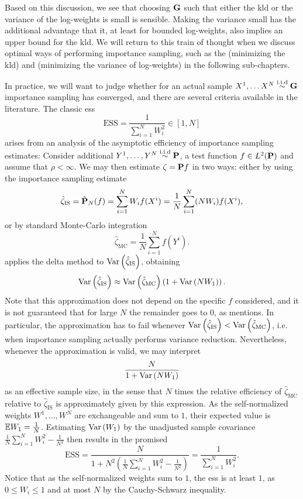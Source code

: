 Based on this discussion, we see that choosing $\G$ such that either the \acrshort{kld} or the variance of the log-weights is small is sensible. Making the variance small has the additional advantage that it, at least for bounded log-weights, also implies an upper bound for the \acrshort{kld}. We will return to this train of thought when we discuss optimal ways of performing importance sampling, such as the \acem (minimizing the \acrshort{kld}) and \aeis (minimizing the variance of log-weights) in the following sub-chapters.

In practice, we will want to judge whether for an actual sample $X^{1}, \dots X^{N} \iid \G$ importance sampling has converged, and there are several criteria available in the literature. The classic \gls{ess}\citep{Kong1994Sequential} 
$$
\text{ESS} = \frac{1}{\sum_{i = 1}^N W^{2}_{i}} \in \left[1, N\right]
$$
arises from an analysis of the asymptotic efficiency of importance sampling estimates: Consider additional $Y^{1}, \dots, Y^{N}\iid \P$, a test function $f \in L^{2} (\P)$ and assume that $\rho < \infty$. We may then estimate $\zeta = \P f$ in two ways: either by using the importance sampling estimate 
$$
\hat \zeta_{\text{IS}} = \hat \P_{N} (f) = \sum_{i = 1}^N W_{i} f(X^{i}) = \frac{1}{N} \sum_{i = 1}^N (NW_{i}) f(X^{i}),
$$
or by standard Monte-Carlo integration 
$$
\hat \zeta_{\text{MC}} = \frac{1}{N}\sum_{i = 1}^N f(Y^{i}).
$$
\citep{Kong1992Note} applies the delta method to $\var \left( \hat\zeta_{\text{IS}} \right)$, obtaining
\begin{align*}
    \var \left( \hat\zeta_{\text{IS}}  \right) \approx \var \left( \hat \zeta_{\text{MC}} \right)\left( 1 + \var \left( NW_{1}\right) \right).
\end{align*}
Note that this approximation does not depend on the specific $f$ considered, and it is not guaranteed that for large $N$ the remainder goes to $0$, as \citep{Kong1992Note} mentions. In particular, the approximation has to fail whenever $\var \left( \hat\zeta_{\text{IS}} \right) < \var \left( \hat \zeta_{\text{MC}} \right)$, i.e. when importance sampling actually performs variance reduction. Nevertheless, whenever the approximation is valid, we may interpret 
$$
\frac{N}{1 + \var \left( NW_{1} \right)}
$$
as an effective sample size, in the sense that $N$ times the relative efficiency of $\hat\zeta_{\text{MC}}$ relative to $\hat \zeta_{\text{IS}}$ is approximately given by this expression. As the self-normalized  weights $W^{1}, \dots, W^{N}$ are exchangeable and sum to $1$, their expected value is $ \E W_{1} = \frac{1}N$. Estimating $\var \left( W_{1} \right)$ by the unadjusted sample covariance $\frac{1}{N} \sum_{i=1}^N W_{i}^2 - \frac{1}{N^{2}}$ then results in the promised
$$
\text{ESS} = \frac{N}{1 + N^{2}\left(\frac{1}{N} \sum_{i = 1}^N W_{i}^2 - \frac{1}{N^{2}}\right)} = \frac{1}{\sum_{i = 1}^{N} W_{i}^{2}}.
$$
Notice that as the self-normalized weights sum to $1$, the \acrshort{ess} is at least $1$, as $0 \leq W_{i} \leq 1$ and at most $N$ by the Cauchy-Schwarz inequality. 

